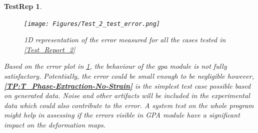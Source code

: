 \documentclass[12pt, titlepage]{article}
\newtheorem{TestRep}{TestRep}
\begin{document}
\begin{TestRep}
\begin{figure}[H]
\begin{center}
\texttt{[image: Figures/Test\_2\_test\_error.png]}
\caption{1D representation of the error measured for all the cases tested in 
\cref{Test_Report_2}}
\label{fig:Test_2_Test_error}
\end{center}
\end{figure}

Based on the error plot in \cref{fig:Test_2_Test_error}, the behaviour of the 
gpa module is not fully satisfactory. Potentially, the error could be small 
enough to be negligible however, \textbf{\cref{TP:T_Phase-Extraction-No-Strain}} 
is the simplest test case possible based on generated data. Noise and other 
artifacts will be included in the experimental data which could also contribute 
to the error. A system test on the whole program might help in assessing if the 
errors visible in GPA module have a significant impact on the deformation maps. 
\bigskip
\end{TestRep}
\end{document}
